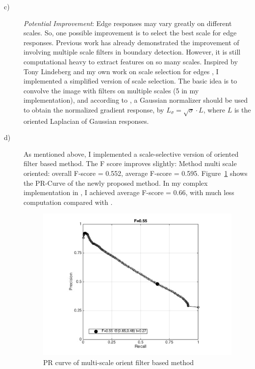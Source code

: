 \documentclass[11pt]{article}
\begin{document}
\begin{description}
\item[c)] \emph{Potential Improvement}: Edge responses may vary greatly on different scales. So, one possible improvement is to select the best scale for edge responses. Previous work \cite{ren2008multi} has already demonstrated the improvement of involving multiple scale filters in boundary detection. However, it is still computational heavy to extract features on so many scales. Inspired by Tony Lindeberg \cite{lindeberg1998feature} and my own work on scale selection for edges \cite{liu2012scale}, I implemented a simplified version of scale selection. The basic idea is to convolve the image with filters on multiple scales (5 in my implementation), and according to \cite{lindeberg1998feature}, a Gaussian normalizer should be used to obtain the normalized gradient response, by $L_{\sigma} = \sqrt{\sigma} \cdot L$, where $L$ is the oriented Laplacian of Gaussian responses. 

\item[d)]  As mentioned above, I implemented a scale-selective version of oriented filter based method. The F score improves slightly: Method multi scale oriented: overall F-score = 0.552, average F-score = 0.595. Figure~\ref{fig:pr_ms} shows the PR-Curve of the newly proposed method. In my complex implementation in \cite{liu2012scale}, I achieved average F-score = 0.66, with much less computation compared with \cite{ren2008multi}.

\begin{figure}[htb]
\includegraphics[width=0.5\linewidth]{./img/pr_full_ms.png}
\caption{PR curve of multi-scale orient filter based method}
\label{fig:pr_ms}
\end{figure}

\end{description}



 
\end{document}
